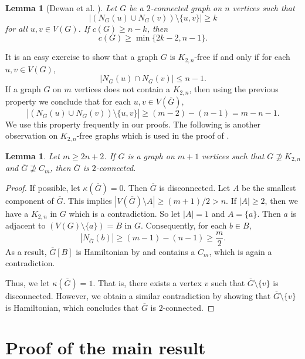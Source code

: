 \documentclass[12pt]{article}
\newtheorem{lemma}[theorem]{Lemma}
\theoremstyle{definition}
\begin{document}
\begin{lemma}[Dewan et al. \cite{dewan2026ramsey}]\label{lem:cycle_lemma}
Let $G$ be a $2$-connected graph on $n$ vertices such that
\[
|(N_G(u)\cup N_G(v))\setminus\{u,v\}|\geq k
\]
for all $u,v\in V(G)$. If $c(G)\geq n-k$, then
\[
c(G)\geq \min\{2k-2, n-1\}.
\]
\end{lemma}
It is an easy exercise to show that a graph $G$ is $K_{2,n}$-free if and only if for each $u,v\in V(G)$, $$|N_G(u)\cap N_G(v)|\leq n-1.$$
If a graph $G$ on $m$ vertices does not contain a $K_{2,n}$, then using the previous property we conclude that for each $u,v\in V(\overline{G})$, $$|(N_{\overline{G}}(u)\cup N_{\overline{G}}(v))\setminus \{u,v\}|\geq (m-2)-(n-1)=m-n-1.$$ We use this property frequently in our proofs. The following is another observation on $K_{2,n}$-free graphs which is used in the proof of 
.
\begin{lemma}\label{2-connected lemma}
    Let $m\geq 2n+2$. If $G$ is a graph on $m+1$ vertices such that $ G\nsupseteq K_{2,n}$ and  $\overline{G}\nsupseteq C_{m}$, then $\overline{G}$ is $2$-connected. 
\end{lemma}
\begin{proof}
     If possible, let $\kappa(\overline{G})=0$. Then $\overline{G}$ is disconnected. Let $A$ be the smallest component of $\overline{G}$. This implies $|V(\overline{G})\setminus A|\geq (m+1)/2>n$. If $|A|\geq 2$, then we have a $K_{2,n}$ in $G$ which is a contradiction. So let $|A|=1$ and $A=\{a\}$. Then $a$ is adjacent to $(V(G)\setminus \{a\})=B$ in $G$. Consequently, for each $b\in B$,
    \begin{equation*}
        |N_{\overline{G}}(b)|\geq \left(m-1\right)-(n-1)\geq \frac{m}{2}.
    \end{equation*}
    As a result, $\overline{G}[B]$ is Hamiltonian by  and contains a $C_{m}$, which is again a contradiction.
    
    Thus, we let $\kappa(\overline{G})=1$. That is, there exists a vertex $v$ such that $\overline{G}\setminus \{v\}$ is disconnected. However, we obtain a similar contradiction by showing that $\overline{G}\setminus \{v\}$ is Hamiltonian, which concludes that $\overline{G}$ is $2$-connected.
\end{proof}


\section{Proof of the main result}
\end{document}
